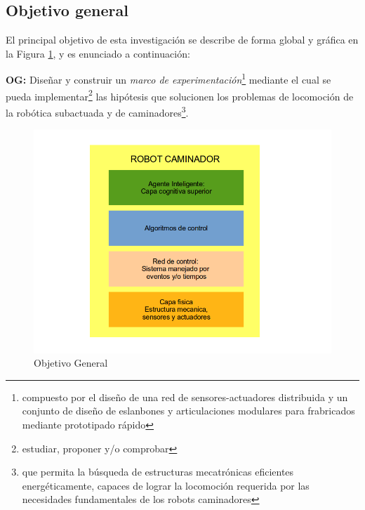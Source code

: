 \subsection[General]{Objetivo general}
\label{sec:objgen}
El principal objetivo de esta investigaci\'on se describe de forma global y gr\'afica en la Figura \ref{fig:objGen}, y es enunciado a continuaci\'on:\par
\textbf{OG:} Dise\~nar y construir un \emph{marco de experimentaci\'on}\footnote{compuesto por el dise\~no de una red de sensores-actuadores distribuida y un conjunto de dise\~no de eslanbones y articulaciones modulares para frabricados mediante prototipado r\'apido} mediante el cual se pueda implementar\footnote{estudiar, proponer y/o comprobar} las hip\'otesis que solucionen los problemas de locomoci\'on de la rob\'otica subactuada y de caminadores\footnote{que permita la b\'usqueda de estructuras mecatr\'onicas eficientes energ\'eticamente, capaces de lograr la locomoci\'on requerida por las necesidades fundamentales de los robots caminadores}.\par
\begin{figure}[!htb]
  \centering
  \includegraphics[scale=0.5]{../images/objGen.png}
  \caption{Objetivo General}
  \label{fig:objGen}
\end{figure}

